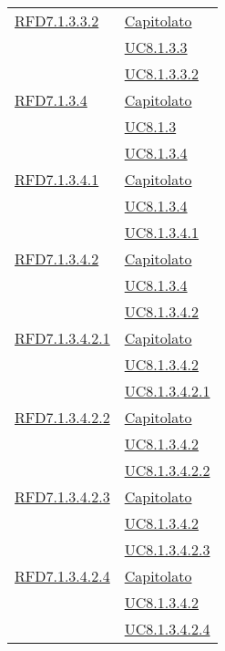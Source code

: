\begin{longtable}{|>{\centering}m{5cm}|m{5cm}<{\centering}|}
\hyperlink{RFD7.1.3.3.2}{RFD7.1.3.3.2} & \hyperlink{Capitolato}{Capitolato}\\
& \hyperref[UC8.1.3.3]{UC8.1.3.3}\\
& \hyperref[UC8.1.3.3.2]{UC8.1.3.3.2}\\ \hline

\hyperlink{RFD7.1.3.4}{RFD7.1.3.4} & \hyperlink{Capitolato}{Capitolato}\\
& \hyperref[UC8.1.3]{UC8.1.3}\\
& \hyperref[UC8.1.3.4]{UC8.1.3.4}\\ \hline

\hyperlink{RFD7.1.3.4.1}{RFD7.1.3.4.1} & \hyperlink{Capitolato}{Capitolato}\\
& \hyperref[UC8.1.3.4]{UC8.1.3.4}\\
& \hyperref[UC8.1.3.4.1]{UC8.1.3.4.1}\\ \hline

\hyperlink{RFD7.1.3.4.2}{RFD7.1.3.4.2} & \hyperlink{Capitolato}{Capitolato}\\
& \hyperref[UC8.1.3.4]{UC8.1.3.4}\\
& \hyperref[UC8.1.3.4.2]{UC8.1.3.4.2}\\ \hline

\hyperlink{RFD7.1.3.4.2.1}{RFD7.1.3.4.2.1} & \hyperlink{Capitolato}{Capitolato}\\
& \hyperref[UC8.1.3.4.2]{UC8.1.3.4.2}\\
& \hyperref[UC8.1.3.4.2.1]{UC8.1.3.4.2.1}\\ \hline

\hyperlink{RFD7.1.3.4.2.2}{RFD7.1.3.4.2.2} & \hyperlink{Capitolato}{Capitolato}\\
& \hyperref[UC8.1.3.4.2]{UC8.1.3.4.2}\\
& \hyperref[UC8.1.3.4.2.2]{UC8.1.3.4.2.2}\\ \hline

\hyperlink{RFD7.1.3.4.2.3}{RFD7.1.3.4.2.3} & \hyperlink{Capitolato}{Capitolato}\\
& \hyperref[UC8.1.3.4.2]{UC8.1.3.4.2}\\
& \hyperref[UC8.1.3.4.2.3]{UC8.1.3.4.2.3}\\ \hline

\hyperlink{RFD7.1.3.4.2.4}{RFD7.1.3.4.2.4} & \hyperlink{Capitolato}{Capitolato}\\
& \hyperref[UC8.1.3.4.2]{UC8.1.3.4.2}\\
& \hyperref[UC8.1.3.4.2.4]{UC8.1.3.4.2.4}\\ \hline


\end{longtable}
